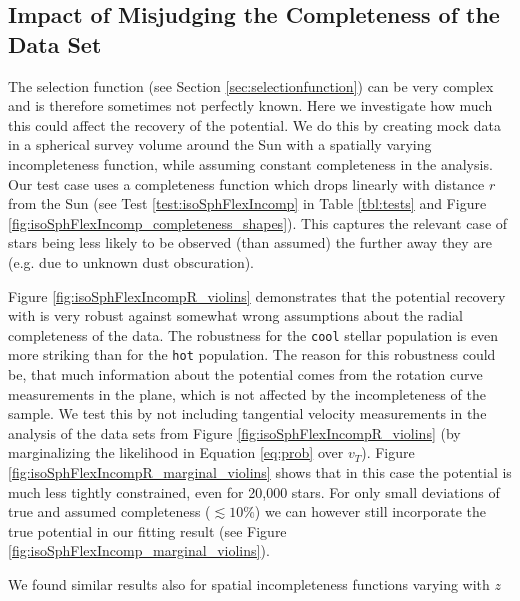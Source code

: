 \subsection{Impact of Misjudging the Completeness of the Data Set} \label{sec:results_incompR}

The selection function (see Section \ref{sec:selectionfunction}) can be very complex and is therefore sometimes not perfectly known. Here we investigate how much this could affect the recovery of the potential. We do this by creating mock data in a spherical survey volume around the Sun with a spatially varying incompleteness function, while assuming constant completeness in the \RM{} analysis. Our test case uses a completeness function which drops linearly with distance $r$ from the Sun (see Test \ref{test:isoSphFlexIncomp} in Table \ref{tbl:tests} and Figure \ref{fig:isoSphFlexIncomp_completeness_shapes}). This captures the relevant case of stars being less likely to be observed (than assumed) the further away they are (e.g. due to unknown dust obscuration). 

Figure \ref{fig:isoSphFlexIncompR_violins} demonstrates that the potential recovery with \RM{} is very robust against somewhat wrong assumptions about the radial completeness of the data. The robustness for the \texttt{cool} stellar population is even more striking than for the \texttt{hot} population. The reason for this robustness could be, that much information about the potential comes from the rotation curve measurements in the plane, which is not affected by the incompleteness of the sample. We test this by not including tangential velocity measurements in the analysis of the data sets from Figure \ref{fig:isoSphFlexIncompR_violins} (by marginalizing the likelihood in Equation \ref{eq:prob} over $v_T$). Figure \ref{fig:isoSphFlexIncompR_marginal_violins} shows that in this case the potential is much less tightly constrained, even for 20,000 stars. For only small deviations of true and assumed completeness ($\lesssim 10\%$) we can however still incorporate the true potential in our fitting result (see Figure \ref{fig:isoSphFlexIncomp_marginal_violins}).

We found similar results also for spatial incompleteness functions varying with $z$



